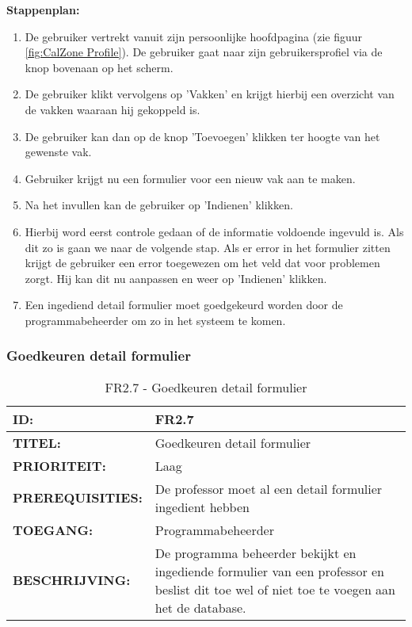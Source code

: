 \textbf{Stappenplan:}
	\begin{enumerate}
	\item  De gebruiker vertrekt vanuit zijn persoonlijke hoofdpagina (zie figuur \ref{fig:CalZone Profile}). De gebruiker gaat naar zijn gebruikersprofiel via de knop bovenaan op het scherm.
	\item De gebruiker klikt vervolgens op 'Vakken' en krijgt hierbij een overzicht van de vakken waaraan hij gekoppeld is.
	\item De gebruiker kan dan op de knop 'Toevoegen' klikken ter hoogte van het gewenste vak.
	\item Gebruiker krijgt nu een formulier voor een nieuw vak aan te maken.
	\item Na het invullen kan de gebruiker op 'Indienen' klikken.
	\item Hierbij word eerst controle gedaan of de informatie voldoende ingevuld is. Als dit zo is gaan we naar de volgende stap. Als er error in het formulier zitten krijgt de gebruiker een error toegewezen om het veld dat voor problemen zorgt. Hij kan dit nu aanpassen en weer op 'Indienen' klikken.
	\item Een ingediend detail formulier moet goedgekeurd worden door de programmabeheerder om zo in het systeem te komen.
	\end{enumerate}

\subsubsection{Goedkeuren detail formulier}     
\noindent\begin{table}[H]
            \begin{tabular}{l | p{10cm}}
                \textbf{ID:} & FR2.7 \\ \hline
                \textbf{TITEL:} & Goedkeuren detail formulier   \\ \hline
                \textbf{PRIORITEIT:} &  Laag \\ \hline
                \textbf{PREREQUISITIES:} & De professor moet al een detail formulier ingedient hebben\\ \hline
                \textbf{TOEGANG:} & Programmabeheerder \\ \hline
                \textbf{BESCHRIJVING:} & De programma beheerder bekijkt en ingediende formulier van een professor en beslist dit toe wel of niet toe te voegen aan het de database. 
            \end{tabular}\\
            \caption{FR2.7 - Goedkeuren detail formulier  }
            \label{tab:FR2.7 - Goedkeuren detail formulier  }
        \end{table}
 
